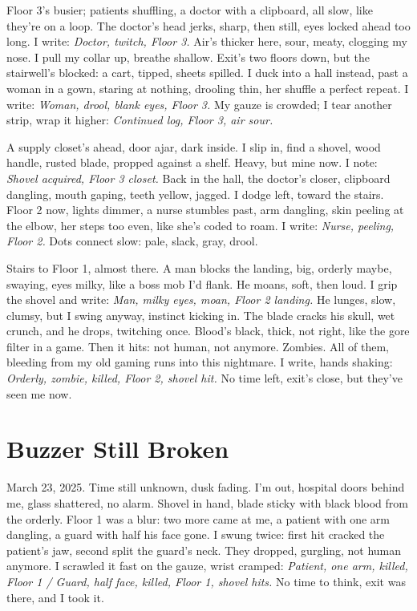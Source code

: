 \documentclass{article}
\begin{document}
Floor 3's busier; patients shuffling, a doctor with a clipboard, all slow, like they're on a loop. The doctor's head jerks, sharp, then still, eyes locked ahead too long. I write: \textit{Doctor, twitch, Floor 3.} Air's thicker here, sour, meaty, clogging my nose. I pull my collar up, breathe shallow. Exit's two floors down, but the stairwell's blocked: a cart, tipped, sheets spilled. I duck into a hall instead, past a woman in a gown, staring at nothing, drooling thin, her shuffle a perfect repeat. I write: \textit{Woman, drool, blank eyes, Floor 3.} My gauze is crowded; I tear another strip, wrap it higher: \textit{Continued log, Floor 3, air sour.}

A supply closet's ahead, door ajar, dark inside. I slip in, find a shovel, wood handle, rusted blade, propped against a shelf. Heavy, but mine now. I note: \textit{Shovel acquired, Floor 3 closet.} Back in the hall, the doctor's closer, clipboard dangling, mouth gaping, teeth yellow, jagged. I dodge left, toward the stairs. Floor 2 now, lights dimmer, a nurse stumbles past, arm dangling, skin peeling at the elbow, her steps too even, like she's coded to roam. I write: \textit{Nurse, peeling, Floor 2.} Dots connect slow: pale, slack, gray, drool.

Stairs to Floor 1, almost there. A man blocks the landing, big, orderly maybe, swaying, eyes milky, like a boss mob I'd flank. He moans, soft, then loud. I grip the shovel and write: \textit{Man, milky eyes, moan, Floor 2 landing.} He lunges, slow, clumsy, but I swing anyway, instinct kicking in. The blade cracks his skull, wet crunch, and he drops, twitching once. Blood's black, thick, not right, like the gore filter in a game. Then it hits: not human, not anymore. Zombies. All of them, bleeding from my old gaming runs into this nightmare. I write, hands shaking: \textit{Orderly, zombie, killed, Floor 2, shovel hit.} No time left, exit's close, but they've seen me now.

\section{Buzzer Still Broken}

March 23, 2025. Time still unknown, dusk fading. I'm out, hospital doors behind me, glass shattered, no alarm. Shovel in hand, blade sticky with black blood from the orderly. Floor 1 was a blur: two more came at me, a patient with one arm dangling, a guard with half his face gone. I swung twice: first hit cracked the patient's jaw, second split the guard's neck. They dropped, gurgling, not human anymore. I scrawled it fast on the gauze, wrist cramped: \textit{Patient, one arm, killed, Floor 1 / Guard, half face, killed, Floor 1, shovel hits.} No time to think, exit was there, and I took it.
\end{document}
